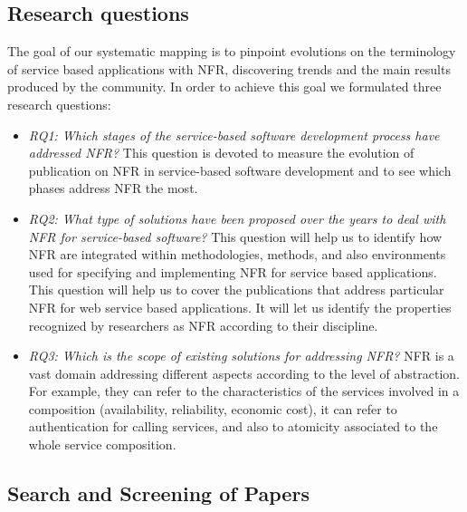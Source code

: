 \subsection{Research questions}
\label{sec:ResearchQuestions}

The  goal of our systematic mapping is to pinpoint evolutions
on the terminology of service based applications with NFR, discovering trends and the main results
produced by the community. In order to achieve this goal we formulated three research questions:
\begin{itemize}
\item {\em RQ1: Which stages of  the service-based software development process have addressed NFR?} This question is devoted to measure the evolution of publication on NFR in service-based software development and to see  which phases address NFR the most. 
\item {\em RQ2: What type of solutions have been proposed over the years to deal with NFR for service-based software?} 
This question will help us to identify how NFR are integrated within methodologies, methods, and also environments used for specifying and implementing NFR for service based applications. This question will help us to cover the publications that address particular NFR for web service based applications. It will let us identify the properties recognized by researchers as NFR according to their discipline.

\item  {\em RQ3: Which is the scope of existing solutions for addressing NFR?} NFR is a vast domain addressing different aspects according to the level of abstraction. For example, they can refer to the characteristics of the services involved in a composition (availability, reliability, economic cost), it can refer to authentication for calling services, and also to atomicity associated to the whole service composition. 


\end{itemize}


\subsection{Search and Screening of Papers}

